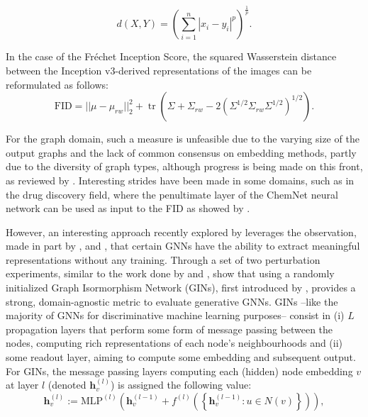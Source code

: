 \begin{equation}
  \label{eq:minkoski}
  d\left(X,Y\right)=\left(\sum _{i=1}^{n}|x_{i}-y_{i}|^{p}\right)^{\frac {1}{p}}.
\end{equation}

In the case of the Fr\'echet Inception Score, the squared Wasserstein distance
between the Inception v3-derived representations of the images can be
reformulated as follows:
\begin{equation}
  \label{eq:fid}
  \text{FID}=||\mu -\mu _{rw}||_{2}^{2}+\operatorname {tr} (\Sigma +\Sigma
_{rw}-2(\Sigma ^{1/2}\Sigma _{rw}\Sigma ^{1/2})^{1/2}).
\end{equation}

For the graph domain, such a measure is unfeasible due to the varying size of
the output graphs and the lack of common consensus on embedding methods, partly
due to the diversity of graph types, although progress is being made on this
front, as reviewed by \cite{xu2021understanding}. Interesting strides have been
made in some domains, such as in the drug discovery field, where the penultimate
layer of the ChemNet neural network can be used as input to the FID as showed by
\cite{preuer2018frechet}.

However, an interesting approach recently explored by
\cite{thompson2022evaluation} leverages the observation, made in part by
\cite{xu2018powerful,morris2019weisfeiler}, and \cite{kipf2016semi}, that
certain GNNs have the ability to extract meaningful
representations without any training. Through a set of two perturbation
experiments, similar to the work done by \cite{xu2018empirical} and
\cite{o2021evaluation}, \cite{thompson2022evaluation} show that using a
randomly initialized Graph Isormorphism Network (GINs), first introduced by
\cite{xu2018powerful}, provides a strong, domain-agnostic metric to evaluate
generative GNNs. GINs --like the majority of GNNs for discriminative machine
learning purposes-- consist in (i) $L$ propagation layers that perform some form
of message passing between the nodes, computing rich representations of each
node's neighbourhoods and (ii) some readout layer, aiming to compute some
embedding and subsequent output. For GINs, the message passing layers computing
each (hidden) node embedding $v$ at layer $l$ (denoted $\mathbf{h}_{v}^{(l)}$)
is assigned the following value:
\begin{equation}
  \label{eq:mplgin}
  \mathbf{h}_{v}^{(l)}:=\text{MLP}^{(l)}\left(\mathbf{h}_{v}^{(l-1)} +
f^{(l)}\left(\left\{ \mathbf{h}_{v}^{(l-1)}: u\in N(v)\right\}\right)\right),
\end{equation}

